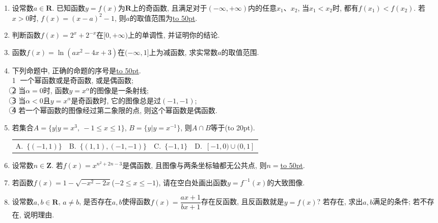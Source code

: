 \documentclass[10pt,a4paper]{article}
\newcommand{\blank}[1]{\underline{\hbox to #1pt{}}}
\newcommand{\bracket}[1]{(\hbox to #1pt{})}
\newcommand{\fourch}[4]{\par\begin{tabular}{p{.23\textwidth}p{.23\textwidth}p{.23\textwidth}p{.23\textwidth}}
A.~#1 &B.~#2& C.~#3& D.~#4
\end{tabular}}
\begin{document}
\begin{enumerate}[1.]
\item 设常数$a\in \mathbf{R}$. 已知函数$y=f(x)$为$\mathbf{R}$上的奇函数, 且满足对于$(-\infty , +\infty)$内的任意$x_1$、$x_2$, 当$x_1<x_2$时, 都有$f(x_1)<f(x_2)$. 若$x>0$时, $f(x)=(x-a)^2-1$, 则$a$的取值范围为\blank{50}.
\item 判断函数$f(x)=2^x+2^{-x}$在$[0,+\infty)$上的单调性, 并证明你的结论.
\item 函数$f(x)=\ln (ax^2-4x+3)$在$(-\infty , 1]$上为减函数, 求实常数$a$的取值范围.
\item 下列命题中, 正确的命题的序号是\blank{50}.\\
\textcircled{1} 一个幂函数或是奇函数, 或是偶函数;\\
\textcircled{2} 当$\alpha =0$时, 函数$y=x^{\alpha }$的图像是一条射线;\\
\textcircled{3} 当$\alpha <0$且$y=x^{\alpha }$是奇函数时, 它的图像总是过$(-1,-1)$;\\
\textcircled{4} 若一个幂函数的图像经过第二象限的点, 则这个幂函数是偶函数.
\item 若集合$A=\{y|y=x^3, \ -1\le x\le 1\}$, $B=\{y|y=x^{-1}\}$, 则$A\cap B$等于\bracket{20}.
\fourch{$\{(-1,1)\}$}{$\{(1,1),(-1,-1)\}$}{$\{-1,1\}$}{$[-1,0)\cup (0,1]$}
\item 设常数$n\in \mathbf{Z}$. 若$f(x)=x^{n^2+2n-3}$是偶函数, 且图像与两条坐标轴都无公共点, 则$n=$\blank{50}.
\item 若函数$f(x)=1-\sqrt {-x^2-2x}$($-2\le x\le -1$), 请在空白处画出函数$y=f^{-1}(x)$的大致图像.
\item 设常数$a,b\in \mathbf{R}$, $a\ne b$, 是否存在$a, b$使得函数$f(x)=\dfrac{ax+1}{bx+1}$存在反函数, 且反函数就是$y=f(x)$? 若存在, 求出$a, b$满足的条件; 若不存在, 说明理由.


\end{enumerate}
\end{document}

